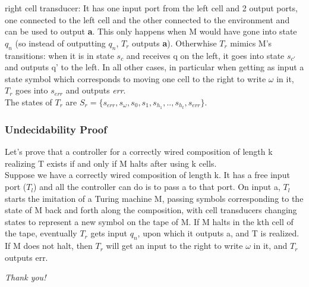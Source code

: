 \documentclass{beamer}
\begin{document}
\begin{frame}
\begin{block}{right cell transducer:} It has one input port from the left cell and 2 output ports, one connected to the left cell and the other connected to the environment and can be used to output \textbf{a}. This only happens when M would have gone into state $q_{n}$ (so instead of outputting $q_{n}$, $T_{r}$ outputs \textbf{a}). Otherwhise $T_{r}$ mimics M's transitions: when it is in state $s_{c}$ and receives q on the left, it goes into state $s_{c'}$ and outputs q' to the left. In all other cases, in particular when getting as input a state symbol which corresponds to moving one cell to the right to write $\omega$ in it, $T_{r}$ goes into $s_{err}$ and outputs \textit{err}. \\
The states of $T_{r}$ are $S_{r} = \{ s_{err}, s_{\omega}, s_{0}, s_{1}, s_{h_{1}},..,s_{h_{t}}, s_{err} \} .$
\end{block}

\end{frame}

\begin{frame}
\frametitle{Undecidability Proof}
Let's prove that a controller for a correctly wired composition of length k realizing T exists if and only if M halts after using k cells.\\
Suppose we have a correctly wired composition of length k. It has a free input port ($T_{l}$) and all the controller can do is to pass a to that port. On input a, $T_{l}$ starts the imitation of a Turing machine M, passing symbols corresponding to the state of M back and forth along the composition, with cell transducers changing states to represent a new symbol on the tape of M. If M halts in the kth cell of the tape, eventually $T_{r}$ gets input $q_{n}$, upon which it outputs a, and T is realized. If M does not halt, then $T_{r}$ will get an input to the right to write $\omega$ in it, and $T_{r}$ outputs err.   


\end{frame}






\begin{frame}{}
  \centering \Large
  \emph{Thank you!}
\end{frame}
\end{document}
